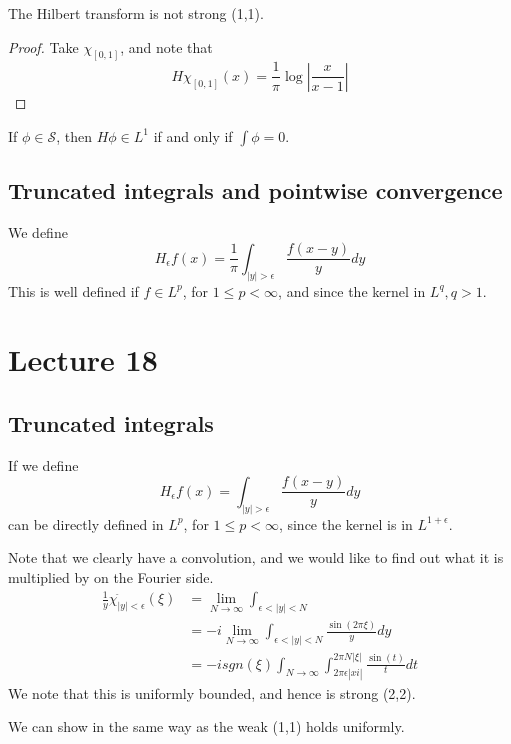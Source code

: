 \begin{proposition}
    The Hilbert transform is not strong (1,1).
\end{proposition}
\begin{proof}
    Take $\chi_{[0,1]}$, and note that
    \begin{equation*}
        H\chi_{[0,1]}(x)=\frac{1}{\pi}\log\left|\frac{x}{x-1} \right|
    \end{equation*}
    
\end{proof}

\begin{proposition}
    If $\phi\in\mathcal{S}$, then $H\phi\in L^1$ if and only if $\int\phi=0$.
\end{proposition}

\subsection{Truncated integrals and pointwise convergence}
We define
\begin{equation*}
    H_\epsilon f(x)=\frac{1}{\pi}\int_{|y|>\epsilon}\frac{f(x-y)}{y}dy
\end{equation*}
This is well defined if $f\in L^p$, for $1\leq p<\infty$, and since the kernel in $L^q, q>1$.


\section{Lecture 18}
\subsection{Truncated integrals}
If we define
\begin{equation*}
    H_\epsilon f(x)=\int_{|y|>\epsilon}\frac{f(x-y)}{y}dy
\end{equation*}
can be directly defined in $L^p$, for $1\leq p<\infty$, since the kernel is in $L^{1+\epsilon}$.

Note that we clearly have a convolution, and we would like to find out what it is multiplied by on the Fourier side.
\begin{align*}
    \frac{1}{y}\chi_{|y|<\epsilon}^{\widehat{\phantom{.}}}(\xi)&=
    \lim_{N\to\infty}\int_{\epsilon<|y|< N}\\
    &=-i\lim_{N\to\infty}\int_{\epsilon<|y|<N}\frac{\sin(2\pi\xi)}{y}dy\\
    &=-isgn(\xi)\int_{N\to\infty}\int_{2\pi\epsilon|xi|}^{2\pi N|\xi|}\frac{\sin(t)}{t}dt
\end{align*}
We note that this is uniformly bounded, and hence is strong (2,2).
\begin{note}
    We can show in the same way as the weak (1,1) holds uniformly.
\end{note}

